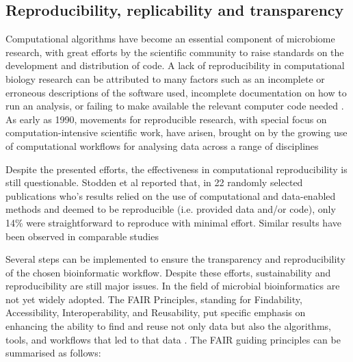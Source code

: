 \subsection{Reproducibility, replicability and transparency} \label{ssec:_intro_reproducibility}

Computational algorithms have become an essential component of microbiome research, with great efforts by the scientific community to raise standards on the development and distribution of code. A lack of reproducibility in computational biology research can be attributed to many factors such as an incomplete or erroneous descriptions of the software used, incomplete documentation on how to run an analysis, or failing to make available the relevant computer code needed \citep{papin_improving_2020}.  As early as 1990, movements for reproducible research, with special focus on computation-intensive scientific work, have arisen, brought on by the growing use of computational workflows for analysing data across a range of disciplines \citep{claerbout_electronic_1992}

Despite the presented efforts, the effectiveness in computational reproducibility is still questionable. Stodden et al \citep{stodden_empirical_2018} reported that, in 22 randomly selected publications who's results relied on the use of computational and data-enabled methods and deemed to be reproducible (i.e. provided data and/or code), only 14\% were straightforward to reproduce with minimal effort. Similar results have been observed in comparable studies \citep{baggerly_deriving_2009, kim_experimenting_2018, huang_comparability_2013}

Several steps can be implemented to ensure the transparency and reproducibility of the chosen bioinformatic workflow. Despite these efforts, sustainability and reproducibility are still major issues. In the field of microbial bioinformatics are not yet widely adopted. The FAIR Principles, standing for Findability, Accessibility, Interoperability, and Reusability, put specific emphasis on enhancing the ability to find and reuse not only data but also the algorithms, tools, and workflows that led to that data \citep{wilkinson_fair_2016}. The FAIR guiding principles can be summarised as follows:

